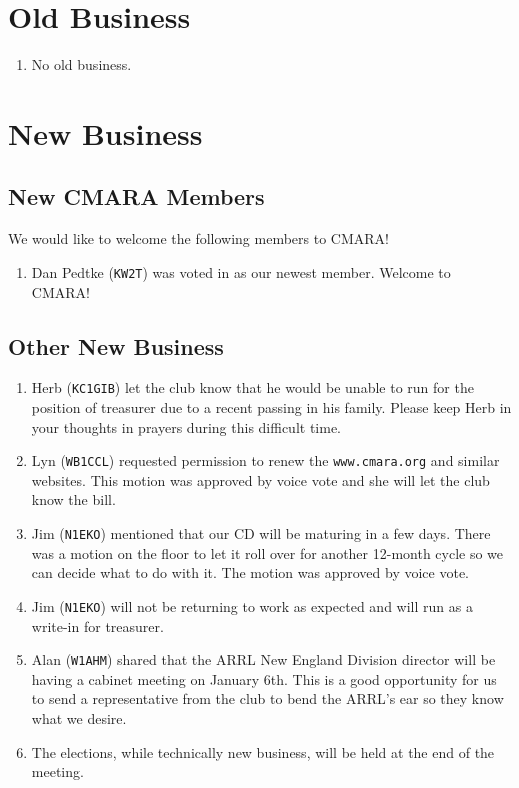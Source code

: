 \documentclass[10pt,letterpaper]{article}
\begin{document}
\section{Old Business}
\begin{enumerate}
  \item No old business.
\end{enumerate}

\section{New Business}

\subsection{New CMARA Members}
\label{new-cmara-members}
We would like to welcome the following members to CMARA!
\begin{enumerate}
  \item Dan Pedtke (\texttt{KW2T}) was voted in as our newest member. Welcome to CMARA!
\end{enumerate}

\subsection{Other New Business}
\begin{enumerate}
  \item Herb (\texttt{KC1GIB}) let the club know that he would be unable to run for the position of treasurer due to a recent passing in his family. Please keep Herb in your thoughts in prayers during this difficult time.
  \item Lyn (\texttt{WB1CCL}) requested permission to renew the \texttt{www.cmara.org} and similar websites. This motion was approved by voice vote and she will let the club know the bill.
  \item Jim (\texttt{N1EKO}) mentioned that our CD will be maturing in a few days. There was a motion on the floor to let it roll over for another 12-month cycle so we can decide what to do with it. The motion was approved by voice vote.
  \item Jim (\texttt{N1EKO}) will not be returning to work as expected and will run as a write-in for treasurer.
  \item Alan (\texttt{W1AHM}) shared that the ARRL New England Division director will be having a cabinet meeting on January 6th. This is a good opportunity for us to send a representative from the club to bend the ARRL's ear so they know what we desire.
  \item The elections, while technically new business, will be held at the end of the meeting.
\end{enumerate}
\end{document}
